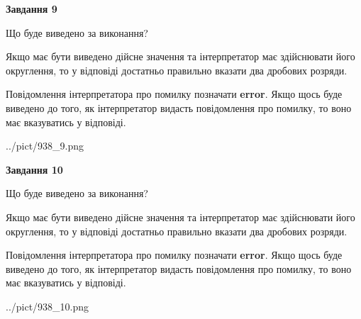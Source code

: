 \documentclass[12pt, ukrainian]{article}
\begin{document}
{\begin {Large}
{\begin {center}\textbf{Завдання 9}\end {center}}\par
Що буде виведено за виконання? \par

Якщо має бути виведено дійсне значення та інтерпретатор має здійснювати його округлення, 
то у відповіді достатньо правильно вказати два дробових розряди.

Повідомлення інтерпретатора про помилку позначати \textbf{error}.
Якщо щось буде виведено до того, як інтерпретатор видасть повідомлення про помилку, 
то воно має вказуватись у відповіді. \par

\begin{center}
	{../pict/938_9.png}
\end{center}
\newpage

{\begin {center}\textbf{Завдання 10}\end {center}}\par
Що буде виведено за виконання? \par

Якщо має бути виведено дійсне значення та інтерпретатор має здійснювати його округлення, 
то у відповіді достатньо правильно вказати два дробових розряди.

Повідомлення інтерпретатора про помилку позначати \textbf{error}.
Якщо щось буде виведено до того, як інтерпретатор видасть повідомлення про помилку, 
то воно має вказуватись у відповіді. \par

\begin{center}
	{../pict/938_10.png}
\end{center}
\newpage

\end {Large}}
\end{document}
